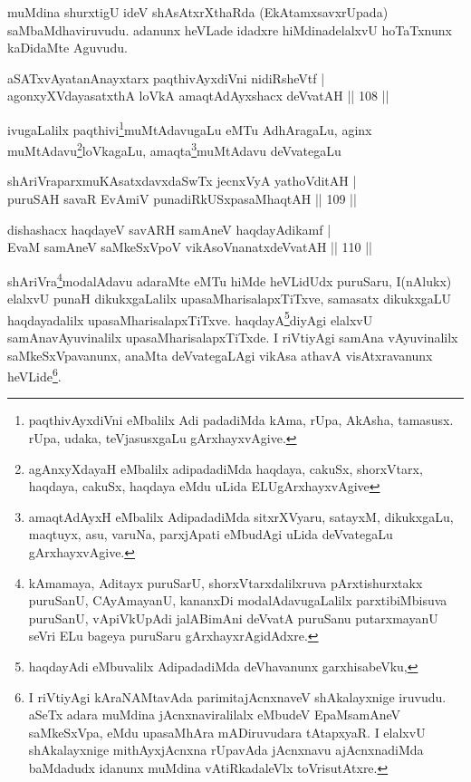 \begin{artha}
muMdina shurxtigU ideV shAsAtxrXthaRda (EkAtamxsavxrUpada) saMbaMdhaviruvudu. adanunx heVLade idadxre hiMdinadelalxvU hoTaTxnunx kaDidaMte Aguvudu.
\end{artha}


\begin{shl}
aSATxvAyatanAnayxtarx paqthivAyxdiVni nidiRsheVtf |\\
agonxyXVdayasatxthA loVkA amaqtAdAyxshacx deVvatAH \hfill || 108 ||
\end{shl}

\begin{artha}
ivugaLalilx paqthivi\footnote[1]{paqthivAyxdiVni eMbalilx Adi padadiMda kAma, rUpa, AkAsha, tamasusx. rUpa, udaka, teVjasusxgaLu gArxhayxvAgive.}muMtAdavugaLu eMTu AdhAragaLu, aginx muMtAdavu\footnote[2]{agAnxyXdayaH eMbalilx adipadadiMda haqdaya, cakuSx, shorxVtarx, haqdaya, cakuSx, haqdaya eMdu uLida ELUgArxhayxvAgive}loVkagaLu, amaqta\footnote[3]{amaqtAdAyxH eMbalilx AdipadadiMda sitxrXVyaru, satayxM, dikukxgaLu, maqtuyx, asu, varuNa, parxjApati eMbudAgi uLida deVvategaLu gArxhayxvAgive.}muMtAdavu deVvategaLu 
\end{artha}

\begin{shl}
shAriVraparxmuKAsatxdavxdaSwTx jecnxVyA yathoVditAH |\\
puruSAH savaR EvAmiV punadiRkUSxpasaMhaqtAH \hfill || 109 ||
\end{shl}

\begin{shl}
dishashacx haqdayeV savARH samAneV haqdayAdikamf |\\
EvaM samAneV saMkeSxVpoV vikAsoV\s nanatxdeVvatAH \hfill || 110 ||
\end{shl}

\begin{artha}
shAriVra\footnote[4]{kAmamaya, Aditayx puruSarU, shorxVtarxdalilxruva pArxtishurxtakx puruSanU, CAyAmayanU, kananxDi modalAdavugaLalilx parxtibiMbisuva puruSanU, vApiVkUpAdi jalABimAni deVvatA puruSanu putarxmayanU seVri ELu bageya puruSaru gArxhayxrAgidAdxre.}modalAdavu adaraMte eMTu hiMde heVLidUdx puruSaru, I(nAlukx) elalxvU punaH dikukxgaLalilx upasaMharisalapxTiTxve, samasatx dikukxgaLU haqdayadalilx upasaMharisalapxTiTxve. haqdayA\footnote[5]{haqdayAdi eMbuvalilx AdipadadiMda deVhavanunx garxhisabeVku,}diyAgi elalxvU samAnavAyuvinalilx upasaMharisalapxTiTxde. I riVtiyAgi samAna vAyuvinalilx saMkeSxVpavanunx, anaMta deVvategaLAgi vikAsa athavA visAtxravanunx heVLide\footnote[6]{I riVtiyAgi kAraNAMtavAda parimitajAcnxnaveV shAkalayxnige iruvudu. aSeTx adara muMdina jAcnxnaviralilalx eMbudeV EpaMsamAneV saMkeSxVpa, eMdu upasaMhAra mADiruvudara tAtapxyaR. I elalxvU shAkalayxnige mithAyxjAcnxna rUpavAda jAcnxnavu ajAcnxnadiMda baMdadudx idanunx muMdina vAtiRkadaleVlx toVrisutAtxre.}.
\end{artha}

